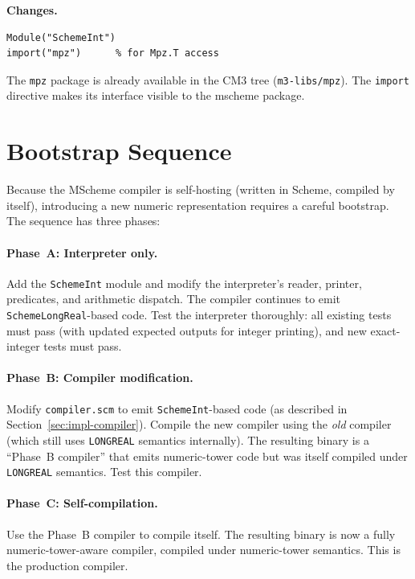 \documentclass[12pt]{article}
\begin{document}
\medskip\noindent\textbf{Changes.}
\begin{lstlisting}
Module("SchemeInt")
import("mpz")      % for Mpz.T access
\end{lstlisting}

\noindent The {\tt mpz} package is already available in the CM3
tree ({\tt m3-libs/mpz}).  The {\tt import} directive makes its
interface visible to the mscheme package.

\section{Bootstrap Sequence}
\label{sec:impl-bootstrap}

Because the MScheme compiler is self-hosting (written in Scheme,
compiled by itself), introducing a new numeric representation
requires a careful bootstrap.  The sequence has three phases:

\paragraph{Phase~A: Interpreter only.}
Add the {\tt SchemeInt} module and modify the interpreter's reader,
printer, predicates, and arithmetic dispatch.  The compiler
continues to emit {\tt SchemeLongReal}-based code.  Test the
interpreter thoroughly: all existing tests must pass (with updated
expected outputs for integer printing), and new exact-integer tests
must pass.

\paragraph{Phase~B: Compiler modification.}
Modify {\tt compiler.scm} to emit {\tt SchemeInt}-based code (as
described in Section~\ref{sec:impl-compiler}).  Compile the new
compiler using the \emph{old} compiler (which still uses
{\tt LONGREAL} semantics internally).  The resulting binary is a
``Phase~B compiler'' that emits numeric-tower code but was itself
compiled under {\tt LONGREAL} semantics.  Test this compiler.

\paragraph{Phase~C: Self-compilation.}
Use the Phase~B compiler to compile itself.  The resulting binary
is now a fully numeric-tower-aware compiler, compiled under
numeric-tower semantics.  This is the production compiler.
\end{document}
